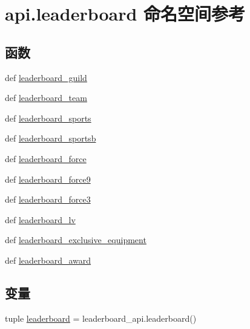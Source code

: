 \hypertarget{namespaceapi_1_1leaderboard}{\section{api.\-leaderboard 命名空间参考}
\label{namespaceapi_1_1leaderboard}
}
\subsection*{函数}
\begin{DoxyCompactItemize}
\item 
def \hyperlink{namespaceapi_1_1leaderboard_afcc217ca66559f62340095d87f1cdd32}{leaderboard\-\_\-guild}
\item 
def \hyperlink{namespaceapi_1_1leaderboard_a0f2027915e9e2c4a15a25bbbadc77555}{leaderboard\-\_\-team}
\item 
def \hyperlink{namespaceapi_1_1leaderboard_ad2e72ebc80429ed6412e6e6d228bfe2c}{leaderboard\-\_\-sports}
\item 
def \hyperlink{namespaceapi_1_1leaderboard_a31d1df6e8e75f1cfe1c8ab9970a5614c}{leaderboard\-\_\-sportsb}
\item 
def \hyperlink{namespaceapi_1_1leaderboard_aa6a45cccf6fbb4d120a82124e6922325}{leaderboard\-\_\-force}
\item 
def \hyperlink{namespaceapi_1_1leaderboard_a6e759402e8c774b61efcce289ae17df5}{leaderboard\-\_\-force9}
\item 
def \hyperlink{namespaceapi_1_1leaderboard_ac868a79dd9a59a1ce17dfb403b1ffdad}{leaderboard\-\_\-force3}
\item 
def \hyperlink{namespaceapi_1_1leaderboard_a9f458de6c9c7d441e3c6c4726fdbbff3}{leaderboard\-\_\-lv}
\item 
def \hyperlink{namespaceapi_1_1leaderboard_a3ce50cc7e048459c1f600ca1cb61af6d}{leaderboard\-\_\-exclusive\-\_\-equipment}
\item 
def \hyperlink{namespaceapi_1_1leaderboard_a267ead618235659b0f72eb8c1fa5750a}{leaderboard\-\_\-award}
\end{DoxyCompactItemize}
\subsection*{变量}
\begin{DoxyCompactItemize}
\item 
tuple \hyperlink{namespaceapi_1_1leaderboard_a2fb23bfbeb9a000a080b9c181bff9825}{leaderboard} = leaderboard\-\_\-api.\-leaderboard()
\end{DoxyCompactItemize}


